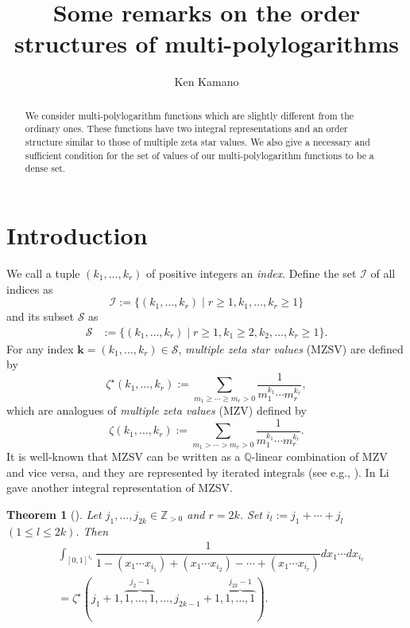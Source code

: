 \documentclass[12pt,a4paper]{article}
\title{Some remarks on
the order structures of 
multi-polylogarithms}
\date{\empty}
\author{Ken Kamano}
\newtheorem{thm}[defi]{Theorem}
\theoremstyle{remark}
\begin{document}
\maketitle

\begin{abstract}

We consider multi-polylogarithm functions
which are slightly different from the ordinary ones.
These functions have two integral representations
and an order structure 
similar to those of multiple zeta star values.
We also give a
necessary and sufficient condition
for 
the set of values of our multi-polylogarithm functions
to be a dense set.
\end{abstract}

\section{Introduction}

We call a tuple $(k_1,\ldots ,k_r)$ of positive integers 
an \textit{index}.
Define the set $\mathcal{I}$ of all indices as 
\[ \mathcal{I}:=
\{ (k_1,\ldots, k_r) \mid r\ge 1, k_1,\ldots, k_r \ge 1\}\]
and its subset $\mathcal{S}$ as
\begin{align*}
\mathcal{S} &:=
\{ (k_1,\ldots, k_r) \mid r\ge 1, k_1\ge 2, k_2,\ldots, k_r \ge 1\}.
\end{align*}
For any index $\boldsymbol{k}
=(k_1,\ldots, k_r)\in \mathcal{S}$, 
\textit{multiple zeta star values} (MZSV)
are defined by
\[ \zeta^{\star}(k_1,\ldots ,k_r)
:=
 \sum_{m_1\ge \cdots \ge m_r>0}
\dfrac{1}{m_1^{k_1}\cdots m_r^{k_r}},
\]
which are analogues of \textit{multiple zeta
values} (MZV) defined by
\[ \zeta(k_1,\ldots ,k_r)
:=
 \sum_{m_1> \cdots > m_r>0}
\dfrac{1}{m_1^{k_1}\cdots m_r^{k_r}}.
\]
It is well-known that 
MZSV can be written as a
$\mathbb{Q}$-linear combination of MZV and 
vice versa, 
and they are represented by iterated integrals (see e.g., \cite{Zha}).
In \cite{Li} Li gave another integral representation
of MZSV. 

\begin{thm}[{\cite[Theorem 1.1 (ii)]{Li}}]
\label{thm:Li_integral}
Let $j_1,\ldots ,j_{2k}\in \mathbb{Z}_{>0}$ and 
$r=2k$.
Set $i_l:= j_1+\cdots +j_l$ $(1\le l \le 2k)$.
Then 
\begin{equation}\label{eq:Li's formula}
\begin{split}
&\displaystyle \int_{[0,1]^{i_r}}
\dfrac{1}{1-(x_1\cdots x_{i_1}) + (x_1\cdots x_{i_2})
- \cdots + (x_1\cdots x_{i_r}) } dx_1 \cdots dx_{i_r}\\
&=
\zeta^{\star}
(j_1+1, \overbrace{1,\ldots ,1}^{j_2-1},
\ldots ,j_{2k-1}+1, \overbrace{1,\ldots ,1}^{j_{2k}-1}).
\end{split}
\end{equation}
\end{thm}
\end{document}
